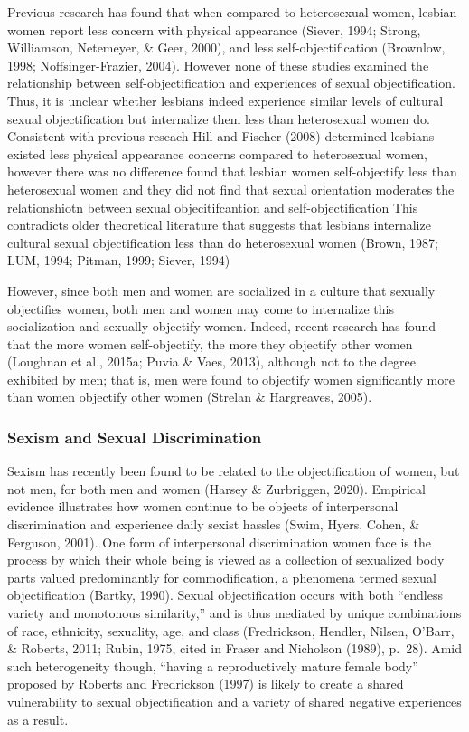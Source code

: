 \documentclass[
  man]{apa6}
\begin{document}
Previous research has found that when compared to heterosexual women,
lesbian women report less concern with physical appearance (Siever,
1994; Strong, Williamson, Netemeyer, \& Geer, 2000), and less
self-objectification (Brownlow, 1998; Noffsinger-Frazier, 2004). However
none of these studies examined the relationship between
self-objectification and experiences of sexual objectification. Thus, it
is unclear whether lesbians indeed experience similar levels of cultural
sexual objectification but internalize them less than heterosexual women
do. Consistent with previous reseach Hill and Fischer (2008) determined
lesbians existed less physical appearance concerns compared to
heterosexual women, however there was no difference found that lesbian
women self-objectify less than heterosexual women and they did not find
that sexual orientation moderates the relationshiotn between sexual
objecitifcantion and self-objectification This contradicts older
theoretical literature that suggests that lesbians internalize cultural
sexual objectification less than do heterosexual women (Brown, 1987;
LUM, 1994; Pitman, 1999; Siever, 1994)

However, since both men and women are socialized in a culture that
sexually objectifies women, both men and women may come to internalize
this socialization and sexually objectify women. Indeed, recent research
has found that the more women self-objectify, the more they objectify
other women (Loughnan et al., 2015a; Puvia \& Vaes, 2013), although not
to the degree exhibited by men; that is, men were found to objectify
women significantly more than women objectify other women (Strelan \&
Hargreaves, 2005).

\subsubsection{Sexism and Sexual
Discrimination}\label{sexism-and-sexual-discrimination}

Sexism has recently been found to be related to the objectification of
women, but not men, for both men and women (Harsey \& Zurbriggen, 2020).
Empirical evidence illustrates how women continue to be objects of
interpersonal discrimination and experience daily sexist hassles (Swim,
Hyers, Cohen, \& Ferguson, 2001). One form of interpersonal
discrimination women face is the process by which their whole being is
viewed as a collection of sexualized body parts valued predominantly for
commodification, a phenomena termed sexual objectification (Bartky,
1990). Sexual objectification occurs with both \enquote{endless variety
and monotonous similarity,} and is thus mediated by unique combinations
of race, ethnicity, sexuality, age, and class (Fredrickson, Hendler,
Nilsen, O'Barr, \& Roberts, 2011; Rubin, 1975, cited in Fraser and
Nicholson (1989), p.~28). Amid such heterogeneity though,
\enquote{having a reproductively mature female body} proposed by Roberts
and Fredrickson (1997) is likely to create a shared vulnerability to
sexual objectification and a variety of shared negative experiences as a
result.
\end{document}
